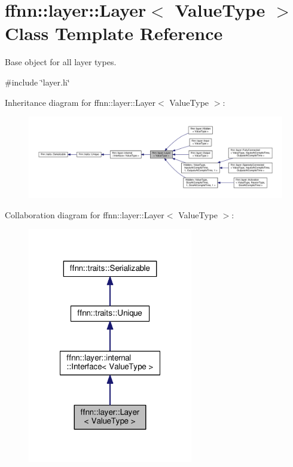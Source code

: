 \hypertarget{classffnn_1_1layer_1_1_layer}{\section{ffnn\-:\-:layer\-:\-:Layer$<$ Value\-Type $>$ Class Template Reference}
\label{classffnn_1_1layer_1_1_layer}
}


Base object for all layer types.  




{\ttfamily \#include \char`\"{}layer.\-h\char`\"{}}



Inheritance diagram for ffnn\-:\-:layer\-:\-:Layer$<$ Value\-Type $>$\-:
\nopagebreak
\begin{figure}[H]
\begin{center}
\leavevmode
\includegraphics[width=350pt]{classffnn_1_1layer_1_1_layer__inherit__graph}
\end{center}
\end{figure}


Collaboration diagram for ffnn\-:\-:layer\-:\-:Layer$<$ Value\-Type $>$\-:
\nopagebreak
\begin{figure}[H]
\begin{center}
\leavevmode
\includegraphics[width=204pt]{classffnn_1_1layer_1_1_layer__coll__graph}
\end{center}
\end{figure}
